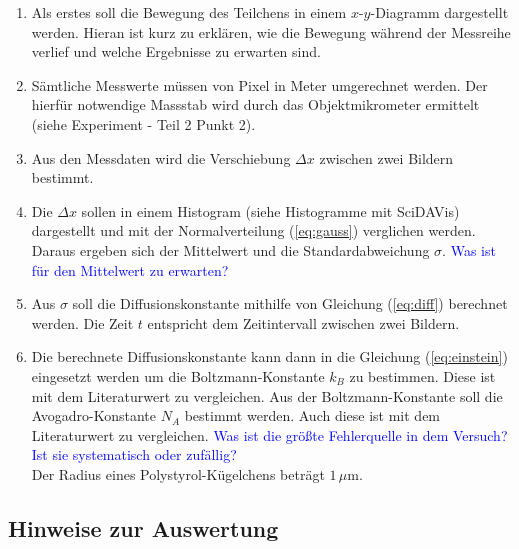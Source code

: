 \begin{enumerate}

  \item Als erstes soll die Bewegung des Teilchens in einem $x$-$y$-Diagramm dargestellt werden. Hieran ist kurz zu erklären, wie die Bewegung während der Messreihe verlief und welche Ergebnisse zu erwarten sind.

  \item Sämtliche Messwerte müssen von Pixel in Meter umgerechnet werden. Der hierfür notwendige Massstab wird durch das Objektmikrometer ermittelt (siehe Experiment - Teil 2 Punkt 2).

  \item Aus den Messdaten wird die Verschiebung $\Delta x$ zwischen zwei Bildern bestimmt.

  \item Die $\Delta x$ sollen in einem Histogram (siehe Histogramme mit SciDAVis) dargestellt und mit der Normalverteilung (\ref{eq:gauss}) verglichen werden. Daraus ergeben sich der Mittelwert und die Standardabweichung $\sigma$. \textcolor{blue}{Was ist für den Mittelwert zu erwarten?}

  \item Aus $\sigma$ soll die Diffusionskonstante mithilfe von Gleichung (\ref{eq:diff}) berechnet werden. Die Zeit $t$ entspricht dem Zeitintervall zwischen zwei Bildern.

  \item Die berechnete Diffusionskonstante kann dann in die Gleichung (\ref{eq:einstein}) eingesetzt werden um die Boltzmann-Konstante $k_B$ zu bestimmen. Diese ist mit dem Literaturwert zu vergleichen. Aus der Boltzmann-Konstante soll die Avogadro-Konstante $N_A$ bestimmt werden. Auch diese ist mit dem Literaturwert zu vergleichen. \textcolor{blue}{Was ist die größte Fehlerquelle in dem Versuch? Ist sie systematisch oder zufällig?}\\
  Der Radius eines Polystyrol-Kügelchens beträgt $1\,\mu$m.

\end{enumerate}


\subsection*{Hinweise zur Auswertung}

